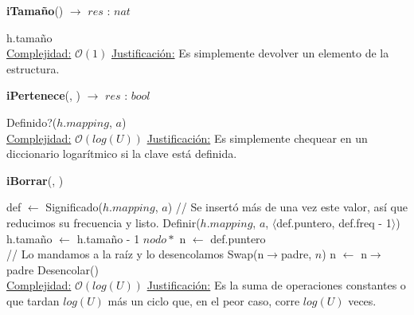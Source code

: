 \begin{Algoritmos}
    \begin{algorithm}
    \caption{\textbf{iTamaño}() $\to$ $res$ : $nat$}
    \begin{algorithmic}
        \State \Return h.tamaño
        \\
        \Statex \underline{Complejidad:} $\mathcal{O}(1)$
        \Statex \underline{Justificación:} Es simplemente devolver un elemento de la estructura.
    \end{algorithmic}
    \end{algorithm}

    \begin{algorithm}
    \caption{\textbf{iPertenece}(, ) $\to$ $res$ : $bool$}
    \begin{algorithmic}
        \State \Return Definido?($h.mapping$, $a$)
        \\
        \Statex \underline{Complejidad:} $\mathcal{O}(log(U))$
        \Statex \underline{Justificación:} Es simplemente chequear en un diccionario logarítmico si la clave está definida.
    \end{algorithmic}
    \end{algorithm}

    \begin{algorithm}
    \caption{\textbf{iBorrar}(, )}
    \begin{algorithmic}
        \State def $\gets$ Significado($h.mapping$, $a$)  
          
            \State // Se insertó más de una vez este valor, así que reducimos su frecuencia y listo.
            \State Definir($h.mapping$, $a$, $\langle$def.puntero, def.freq - 1$\rangle$)  
            \State h.tamaño $\gets$ h.tamaño - 1  
            \State \Return
        \EndIf
        \State $nodo*$ n $\gets$ def.puntero  
        \\
        \State // Lo mandamos a la raíz y lo desencolamos
          
            \State Swap(n$\to$padre, $n$)  
            \State n $\gets$ n$\to$padre  
        \EndWhile
        \State Desencolar()  
        \\
        \Statex \underline{Complejidad:} $\mathcal{O}(log(U))$
        \Statex \underline{Justificación:} Es la suma de operaciones constantes o que tardan $log(U)$ más un ciclo que, en el peor caso, corre $log(U)$ veces.
    \end{algorithmic}
    \end{algorithm}


\end{Algoritmos}
